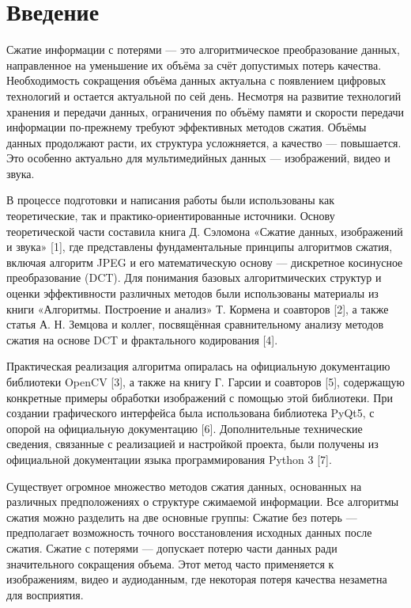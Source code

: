 \section*{Введение}

Сжатие информации с потерями — это алгоритмическое преобразование данных, направленное на уменьшение их объёма за счёт допустимых потерь качества. 
Необходимость сокращения объёма данных актуальна с появлением цифровых технологий и остается актуальной по сей день. 
Несмотря на развитие технологий хранения и передачи данных, ограничения по объёму памяти и скорости передачи информации по-прежнему требуют эффективных методов сжатия. 
Объёмы данных продолжают расти, их структура усложняется, а качество — повышается. 
Это особенно актуально для мультимедийных данных — изображений, видео и звука.

В процессе подготовки и написания работы были использованы как теоретические, 
так и практико-ориентированные источники. 
Основу теоретической части составила книга Д. Сэломона «Сжатие данных, изображений и звука» [1], 
где представлены фундаментальные принципы алгоритмов сжатия, включая алгоритм JPEG 
и его математическую основу — дискретное косинусное преобразование (DCT). 
Для понимания базовых алгоритмических структур и оценки эффективности различных методов были использованы 
материалы из книги «Алгоритмы. Построение и анализ» Т. Кормена и соавторов [2], 
а также статья А. Н. Земцова и коллег, посвящённая сравнительному анализу методов сжатия на основе 
DCT и фрактального кодирования [4].

Практическая реализация алгоритма опиралась на официальную документацию библиотеки OpenCV [3], 
а также на книгу Г. Гарсии и соавторов [5], содержащую конкретные примеры обработки изображений 
с помощью этой библиотеки. При создании графического интерфейса была использована библиотека PyQt5, 
с опорой на официальную документацию [6]. Дополнительные технические сведения, 
связанные с реализацией и настройкой проекта, были получены из официальной документации языка 
программирования Python 3 [7].

Существует огромное множество методов сжатия данных, основанных на различных предположениях о структуре сжимаемой информации. 
Все алгоритмы сжатия можно разделить на две основные группы:
Сжатие без потерь — предполагает возможность точного восстановления исходных данных после сжатия.
Сжатие с потерями — допускает потерю части данных ради значительного сокращения объема. 
Этот метод часто применяется к изображениям, видео и аудиоданным, где некоторая потеря качества незаметна для восприятия.

